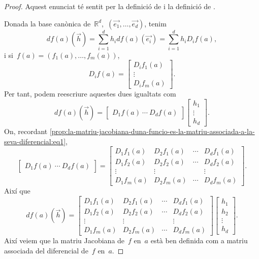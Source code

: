 \documentclass[../../main.tex]{subfiles}
\begin{document}
    \begin{proof}
        Aquest enunciat té sentit per la definició de  i la definició de .

        Donada la base canònica de~\(\mathbb{R}^{d}\),~\((\vec{e_{1}},\dots,\vec{e_{d}})\), tenim
        \[
            df(a)(\vec{h})=\sum_{i=1}^{d}h_{i}df(a)(\vec{e_{i}})=\sum_{i=1}^{d}h_{i}D_{i}f(a),
        \]
        i si~\(f(a)=(f_{1}(a),\dots,f_{m}(a))\),
        \begin{equation}\label{prop:la-matriu-jacobiana-duna-funcio-es-la-matriu-associada-a-la-seva-diferencial:eq1}
        D_{i}f(a)=
        \left[\begin{matrix}
        D_{i}f_{1}(a)\\
        \vdots\\
        D_{i}f_{m}(a)
        \end{matrix}\right].
        \end{equation}
        Per tant, podem reescriure aquestes dues igualtats com
        \[df(a)(\vec{h})=
        \left[\begin{matrix}
        D_{1}f(a)~\cdots~D_{d}f(a)
        \end{matrix}\right]
        \left[\begin{matrix}
        h_{1}\\\vdots\\h_{d}
        \end{matrix}
        \right].\]
        On, recordant \eqref{prop:la-matriu-jacobiana-duna-funcio-es-la-matriu-associada-a-la-seva-diferencial:eq1},
        \[\left[\begin{matrix}
        D_{1}f(a)~\cdots~D_{d}f(a)
        \end{matrix}\right]=
        \left[\begin{matrix}
        D_{1}f_{1}(a) & D_{2}f_{1}(a) & \cdots & D_{d}f_{1}(a)\\
        D_{1}f_{2}(a) & D_{2}f_{2}(a) & \cdots & D_{d}f_{2}(a)\\
        \vdots & \vdots && \vdots \\
        D_{1}f_{m}(a) & D_{2}f_{m}(a) & \cdots & D_{d}f_{m}(a)
        \end{matrix}\right].\]
        Així que
        \[df(a)(\vec{h})=
        \left[\begin{matrix}
        D_{1}f_{1}(a) & D_{2}f_{1}(a) & \cdots & D_{d}f_{1}(a)\\
        D_{1}f_{2}(a) & D_{2}f_{2}(a) & \cdots & D_{d}f_{2}(a)\\
        \vdots & \vdots && \vdots \\
        D_{1}f_{m}(a) & D_{2}f_{m}(a) & \cdots & D_{d}f_{m}(a)
        \end{matrix}\right]
        \left[\begin{matrix}
        h_{1}\\h_{2}\\\vdots\\h_{d}
        \end{matrix}
        \right].\]
        Així veiem que la matriu Jacobiana de~\(f\) en~\(a\) està ben definida com a matriu associada del diferencial de~\(f\) en~\(a\).
    \end{proof}
\end{document}
